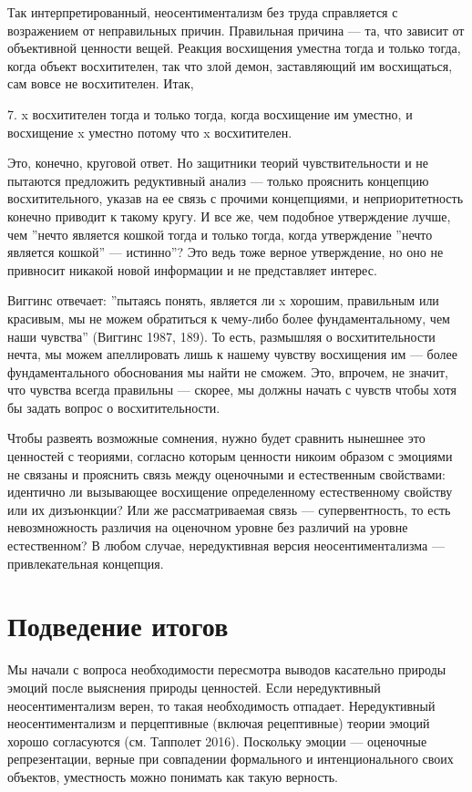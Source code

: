 \documentclass[11pt]{book}
\begin{document}
Так интерпретированный, неосентиментализм без труда справляется с возражением от неправильных причин. Правильная причина --- та, что зависит от объективной ценности вещей. Реакция восхищения уместна тогда и только тогда, когда объект восхитителен, так что злой демон, заставляющий им восхищаться, сам вовсе не восхитителен. Итак,

\smallskip

7. x восхитителен тогда и только тогда, когда восхищение им уместно, и восхищение x уместно потому что x восхитителен.

\smallskip

Это, конечно, круговой ответ. Но защитники теорий чувствительности и не пытаются предложить редуктивный анализ --- только прояснить концепцию восхитительного, указав на ее связь с прочими концепциями, и неприоритетность конечно приводит к такому кругу. И все же, чем подобное утверждение лучше, чем ''нечто является кошкой тогда и только тогда, когда утверждение ''нечто является кошкой'' --- истинно''? Это ведь тоже верное утверждение, но оно не привносит никакой новой информации и не представляет интерес.

Виггинс отвечает: ''пытаясь понять, является ли x хорошим, правильным или красивым, мы не можем обратиться к чему-либо более фундаментальному, чем наши чувства'' (Виггинс 1987, 189). То есть, размышляя о восхитительности нечта, мы можем апеллировать лишь к нашему чувству восхищения им --- более фундаментального обоснования мы найти не сможем. Это, впрочем, не значит, что чувства всегда правильны --- скорее, мы должны начать с чувств чтобы хотя бы задать вопрос о восхитительности.

Чтобы развеять возможные сомнения, нужно будет сравнить нынешнее это ценностей с теориями, согласно которым ценности никоим образом с эмоциями не связаны и прояснить связь между оценочными и естественным свойствами: идентично ли вызывающее восхищение определенному естественному свойству или их дизъюнкции? Или же рассматриваемая связь --- супервентность, то есть невозмножность различия на оценочном уровне без различий на уровне естественном? В любом случае, нередуктивная версия неосентиментализма --- привлекательная концепция.

\section{Подведение итогов}

Мы начали с вопроса необходимости пересмотра выводов касательно природы эмоций после выяснения природы ценностей. Если нередуктивный неосентиментализм верен, то такая необходимость отпадает. Нередуктивный неосентиментализм и перцептивные (включая рецептивные) теории эмоций хорошо согласуются (см. Тапполет 2016). Поскольку эмоции --- оценочные репрезентации, верные при совпадении формального и интенционального своих объектов, уместность можно понимать как такую верность.
\end{document}
